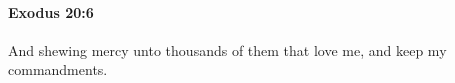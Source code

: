 
		\paragraph{Exodus 20:6} %
			\label{EXODUS-20-6}

			And shewing mercy unto thousands of them that love me, and keep my commandments.


